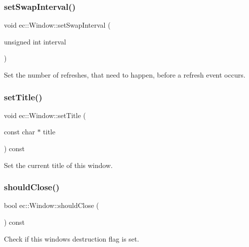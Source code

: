 \mbox{\label{classec_1_1_window_a42f80dede17ab5a599b4cadf0b621d90}} 
\subsubsection{\texorpdfstring{set\+Swap\+Interval()}{setSwapInterval()}}
{\footnotesize\ttfamily void ec\+::\+Window\+::set\+Swap\+Interval (\begin{DoxyParamCaption}\item[{unsigned int}]{interval }\end{DoxyParamCaption})\hspace{0.3cm}{\ttfamily [static]}}

Set the number of refreshes, that need to happen, before a refresh event occurs. \mbox{\label{classec_1_1_window_aad364a4e56d55628c91deffa1a3a64d7}} 
\subsubsection{\texorpdfstring{set\+Title()}{setTitle()}}
{\footnotesize\ttfamily void ec\+::\+Window\+::set\+Title (\begin{DoxyParamCaption}\item[{const char $\ast$}]{title }\end{DoxyParamCaption}) const}

Set the current title of this window. \mbox{\label{classec_1_1_window_a61d3145f30834d380a4077fc83fb5a54}} 
\subsubsection{\texorpdfstring{should\+Close()}{shouldClose()}}
{\footnotesize\ttfamily bool ec\+::\+Window\+::should\+Close (\begin{DoxyParamCaption}{ }\end{DoxyParamCaption}) const}

Check if this window\textquotesingle{}s destruction flag is set. \mbox{\label{classec_1_1_window_abedfe871ebba65fa932f2eb9117373a0}} 
